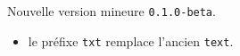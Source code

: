 Nouvelle version mineure \verb+0.1.0-beta+.

\begin{itemize}[itemsep=.5em]
    \item {}
          le préfixe \verb#txt# remplace l'ancien \verb#text#.
\end{itemize}


\separation